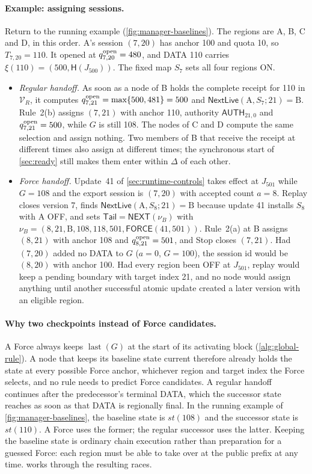 \documentclass[11pt,a4paper]{article}
\newcommand{\Hash}{\mathsf H}
\newcommand{\tagg}[1]{\ensuremath{\mathsf{#1}}}
\begin{document}
\paragraph{Example: assigning sessions.}
Return to the running example (\cref{fig:manager-baselines}). The
regions are A, B, C and D, in this order. A's session $(7,20)$ has
anchor 100 and quota 10, so $T_{7,20}=110$. It opened at
$q^{\rm open}_{7,20}=480$, and DATA 110 carries
$\xi(110)=(500,\Hash(J_{500}))$. The fixed map $S_7$ sets all four
regions ON.
\begin{itemize}
\item \emph{Regular handoff.} As soon as a node of B holds the complete
receipt for 110 in $\mathcal V_R$, it computes
$q^{\rm open}_{7,21}=\max\{500,481\}=500$ and
$\tagg{NextLive}(\text{A},S_7;21)=\text{B}$. Rule~2(b) assigns
$(7,21)$ with anchor 110, authority $\tagg{AUTH}_{21,0}$ and
$q^{\rm open}_{7,21}=500$, while $G$ is still 108. The nodes of C and D
compute the same selection and assign nothing. Two members of B that
receive the receipt at different times also assign at different times;
the synchronous start of \cref{sec:ready} still makes them enter within
$\Delta$ of each other.
\item \emph{Force handoff.} Update~41 of \cref{sec:runtime-controls}
takes effect at $J_{501}$ while $G=108$ and the export session is
$(7,20)$ with accepted count $a=8$. Replay closes version 7, finds
$\tagg{NextLive}(\text{A},S_8;21)=\text{B}$ because update 41 installs
$S_8$ with A OFF, and
sets $\mathsf{Tail}=\tagg{NEXT}(\nu_B)$ with
$\nu_B=(8,21,\text{B},108,118,501,\tagg{FORCE}(41,501))$. Rule~2(a) at B assigns
$(8,21)$ with anchor 108 and $q^{\rm open}_{8,21}=501$, and Stop closes
$(7,21)$. Had $(7,20)$ added no DATA to $G$ ($a=0$, $G=100$), the
session id would be $(8,20)$ with anchor 100. Had every region been OFF
at $J_{501}$, replay would keep a pending boundary with target index 21,
and no node would assign anything until another successful atomic update
created a later version with an eligible region.
\end{itemize}

\paragraph{Why two checkpoints instead of Force candidates.}
A Force always keeps $\operatorname{last}(G)$ at the start of its
activating block (\cref{alg:global-rule}). A node that keeps its baseline state current
therefore already holds the state at every possible Force anchor,
whichever region and target index the Force selects, and no rule needs
to predict Force candidates. A regular handoff continues after the
predecessor's terminal DATA, which the successor state reaches as soon as that DATA is
regionally final.  In the running example of
\cref{fig:manager-baselines}, the baseline state is $\mathit{st}(108)$
and the successor state is $\mathit{st}(110)$.  A Force uses the former;
the regular successor uses the latter.  Keeping the baseline state is ordinary chain execution rather than
preparation for a guessed Force: each region must be able to take over
at the public prefix at any time.   works through
the resulting races.
\end{document}
